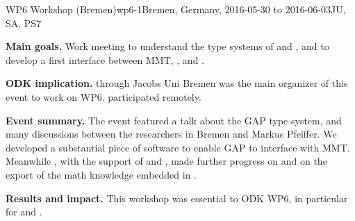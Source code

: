 \begin{event}{WP6 Workshop (Bremen)}{wp6-1}{Bremen, Germany, 2016-05-30 to 2016-06-03}{JU, SA, PS}{7}{}

\textbf{Main goals.} Work meeting to understand the type systems of \GAP and
\Sage, and to develop a first interface between MMT, \GAP, and \Sage.

\textbf{ODK implication.} \ODK through Jacobs Uni Bremen was the main
organizer of this event to work on WP6.  participated remotely.

\textbf{Event summary.} The event featured a talk about the GAP type
system, and many discussions between the researchers in Bremen and
Markus Pfeiffer. We developed a substantial piece of software to
enable GAP to interface with MMT. Meanwhile , with the
support of  and , made further progress on
 and on
the export of the math knowledge embedded in \Sage.

\textbf{Results and impact.}  This workshop was essential to ODK WP6,
in particular for  and
.

\end{event}
